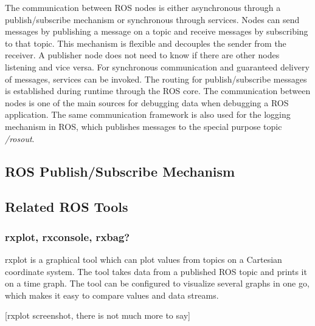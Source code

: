 The communication between ROS nodes is either asynchronous through a publish/subscribe mechanism or synchronous through services. Nodes can send messages by publishing a message on a topic and receive messages by subscribing to that topic. This mechanism is flexible and decouples the sender from the receiver. A publisher node does not need to know if there are other nodes listening and vice versa. For synchronous communication and guaranteed delivery of messages, services can be invoked. The routing for publish/subscribe messages is established during runtime through the ROS core. The communication between nodes is one of the main sources for debugging data when debugging a ROS application. The same communication framework is also used for the logging mechanism in ROS, which publishes messages to the special purpose topic \emph{/rosout}.




\subsection{ROS Publish/Subscribe Mechanism}

\subsection{Related ROS Tools}

\subsubsection{rxplot, rxconsole, rxbag?}
rxplot is a graphical tool which can plot values from topics on a Cartesian coordinate system. The tool takes data from a published ROS topic and prints it on a time graph. The tool can be configured to visualize several graphs in one go, which makes it easy to compare values and data streams.

[rxplot screenshot, there is not much more to say]

